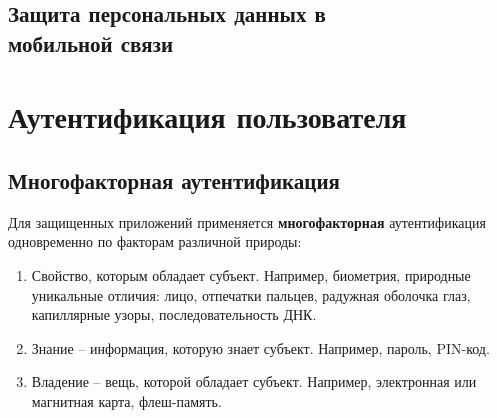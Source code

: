 \documentclass[10pt,a4paper]{book}
\begin{document}










\section[Защита персональных данных в мобильной связи]{Защита персональных данных в \protect\\ мобильной связи}






\chapter{Аутентификация пользователя}


\section{Многофакторная аутентификация}

Для защищенных приложений применяется \textbf{многофакторная} аутентификация одновременно по факторам различной природы:
\begin{enumerate}
    \item Свойство, которым обладает субъект. Например, биометрия, природные уникальные отличия: лицо, отпечатки пальцев, радужная оболочка глаз, капиллярные узоры, последовательность ДНК.
    \item Знание -- информация, которую знает субъект. Например, пароль, PIN-код.
    \item Владение -- вещь, которой обладает субъект. Например, электронная или магнитная карта, флеш-память.
\end{enumerate}
\end{document}
